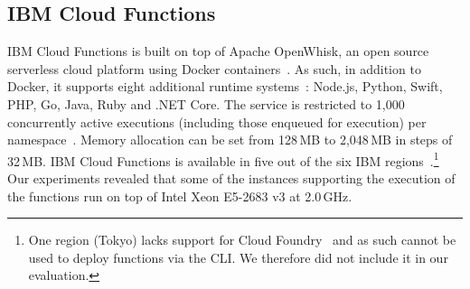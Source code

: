 
\subsection{IBM Cloud Functions}
\label{sec:ss:ibm}

\gls{IBM} Cloud Functions \cite{IBMFunctions} is built on top of Apache OpenWhisk, an open source serverless cloud platform using Docker containers~\cite{OpenWhisk}. 
As such, in addition to Docker, it supports eight additional runtime systems~\cite{IBMRuntimes}: Node.js, Python, Swift, PHP, Go, Java, Ruby and .NET Core.
The service is restricted to 1,000 concurrently active executions (including those enqueued for execution) per namespace~\cite{IBMLimits}. 
Memory allocation can be set from 128\,\gls{MB} to 2,048\,\gls{MB} in steps of 32\,\gls{MB}. 
\gls{IBM} Cloud Functions is available in five out of the six IBM regions~\cite{IBMLocations}.\footnote{One region (Tokyo) lacks support for Cloud Foundry~\cite{IBMCloudFoundry} and as such cannot be used to deploy functions via the \gls{CLI}. We therefore did not include it in our evaluation.} 
Our experiments revealed that some of the instances supporting the execution of the functions run on top of Intel Xeon E5-2683 v3 at 2.0\,\gls{GHz}.



